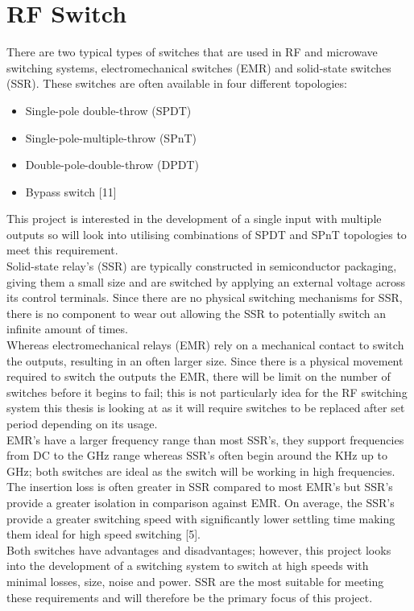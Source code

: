 \documentclass[12pt,openany,a4paper]{book}
\begin{document}
\section{RF Switch}
There are two typical types of switches that are used in RF and microwave switching systems, electromechanical switches (EMR) and solid-state switches (SSR). These switches are often available in four different topologies:
\begin{itemize}
	\setlength\itemsep{-0.5em}
	\item Single-pole double-throw (SPDT)
	\item Single-pole-multiple-throw (SPnT)
	\item Double-pole-double-throw (DPDT)
	\item Bypass switch [11]
\end{itemize}
This project is interested in the development of a single input with multiple outputs so will look into utilising combinations of SPDT and SPnT topologies to meet this requirement. \\
Solid-state relay's (SSR) are typically constructed in semiconductor packaging, giving them a small size and are switched by applying an external voltage across its control terminals. Since there are no physical switching mechanisms for SSR, there is no component to wear out allowing the SSR to potentially switch an infinite amount of times. \\
Whereas electromechanical relays (EMR) rely on a mechanical contact to switch the outputs, resulting in an often larger size. Since there is a physical movement required to switch the outputs the EMR, there will be limit on the number of switches before it begins to fail; this is not particularly idea for the RF switching system this thesis is looking at as it will require switches to be replaced after set period depending on its usage. \\
EMR's have a larger frequency range than most SSR's, they support frequencies from DC to the GHz range whereas SSR's often begin around the KHz up to GHz; both switches are ideal as the switch will be working in high frequencies. The insertion loss is often greater in SSR compared to most EMR's but SSR's provide a greater isolation in comparison against EMR. On average, the SSR's provide a greater switching speed with significantly lower settling time making them ideal for high speed switching [5]. \\
Both switches have advantages and disadvantages; however, this project looks into the development of a switching system to switch at high speeds with minimal losses, size, noise and power. SSR are the most suitable for meeting these requirements and will therefore be the primary focus of this project.
\end{document}
